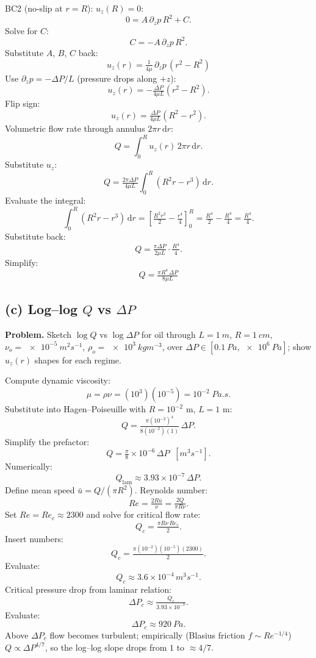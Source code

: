 \documentclass[11pt]{article}
\newcommand{\de}{\mathrm{d}}
\begin{document}
BC2 (no-slip at $r=R$): $u_z(R) = 0$:
\[
0 = A\,\partial_z p\,R^2 + C.
\]
Solve for $C$:
\[
C = -A\,\partial_z p\,R^2.
\]
Substitute $A$, $B$, $C$ back:
\[
\boxed{\;u_z(r) = \tfrac{1}{4\mu}\,\partial_z p\,(r^2 - R^2)\;}
\]
Use $\partial_z p = -\Delta P/L$ (pressure drops along $+z$):
\[
u_z(r) = -\tfrac{\Delta P}{4\mu L}(r^2-R^2).
\]
Flip sign:
\[
u_z(r) = \tfrac{\Delta P}{4\mu L}(R^2 - r^2).
\]
Volumetric flow rate through annulus $2\pi r\,\de r$:
\[
Q = \int_0^R u_z(r)\,2\pi r\,\de r.
\]
Substitute $u_z$:
\[
Q = \tfrac{2\pi\Delta P}{4\mu L}\int_0^R (R^2 r - r^3)\,\de r.
\]
Evaluate the integral:
\[
\int_0^R (R^2 r - r^3)\,\de r = \left[\tfrac{R^2 r^2}{2} - \tfrac{r^4}{4}\right]_0^R = \tfrac{R^4}{2} - \tfrac{R^4}{4} = \tfrac{R^4}{4}.
\]
Substitute back:
\[
Q = \tfrac{\pi\Delta P}{2\mu L}\cdot\tfrac{R^4}{4}.
\]
Simplify:
\[
\boxed{\;Q = \tfrac{\pi R^4\,\Delta P}{8\mu L}\;}
\]

\subsection*{(c) Log--log $Q$ vs $\Delta P$}

\textbf{Problem.} Sketch $\log Q$ vs $\log\Delta P$ for oil through $L=\SI{1}{m}$, $R=\SI{1}{cm}$, $\nu_o = \SI{e-5}{m^2 s^{-1}}$, $\rho_o = \SI{e3}{kg m^{-3}}$, over $\Delta P \in [\SI{0.1}{Pa},\SI{e6}{Pa}]$; show $u_z(r)$ shapes for each regime.

Compute dynamic viscosity:
\[
\mu = \rho\nu = (10^3)(10^{-5}) = 10^{-2}\;\si{Pa.s}.
\]
Substitute into Hagen--Poiseuille with $R=10^{-2}$ m, $L=1$ m:
\[
Q = \tfrac{\pi (10^{-2})^4}{8(10^{-2})(1)}\,\Delta P.
\]
Simplify the prefactor:
\[
Q = \tfrac{\pi}{8}\times 10^{-6}\,\Delta P\;\;[\si{m^3 s^{-1}}].
\]
Numerically:
\[
Q_\text{lam} \approx 3.93\times 10^{-7}\,\Delta P.
\]
Define mean speed $\bar u = Q/(\pi R^2)$. Reynolds number:
\[
Re = \tfrac{2R\bar u}{\nu} = \tfrac{2 Q}{\pi R\nu}.
\]
Set $Re = Re_c \approx 2300$ and solve for critical flow rate:
\[
Q_c = \tfrac{\pi R\nu\,Re_c}{2}.
\]
Insert numbers:
\[
Q_c = \tfrac{\pi(10^{-2})(10^{-5})(2300)}{2}.
\]
Evaluate:
\[
Q_c \approx 3.6\times 10^{-4}\,\si{m^3 s^{-1}}.
\]
Critical pressure drop from laminar relation:
\[
\Delta P_c \approx \tfrac{Q_c}{3.93\times 10^{-7}}.
\]
Evaluate:
\[
\Delta P_c \approx \SI{920}{Pa}.
\]
Above $\Delta P_c$ flow becomes turbulent; empirically (Blasius friction $f\sim Re^{-1/4}$) $Q \propto \Delta P^{4/7}$, so the log--log slope drops from $1$ to $\approx 4/7$.
\end{document}
